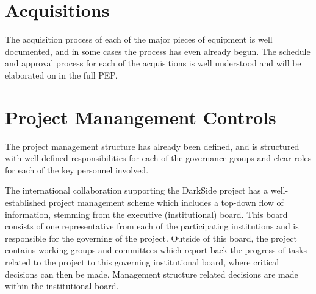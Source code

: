 


\section{Acquisitions}

The acquisition process of each of the major pieces of equipment is well documented, and in some cases the process has even already begun.  The schedule and approval process for each of the acquisitions is well understood and will be elaborated on in the full PEP.




\section{Project Manangement Controls}

The project management structure has already been defined, and is structured with well-defined responsibilities for each of the governance groups and clear roles for each of the key personnel involved.  

The international collaboration supporting the DarkSide project has a well-established project management scheme which includes a top-down flow of information, stemming from the executive (institutional) board.  This board consists of one representative from each of the participating institutions and is responsible for the governing of the project.  Outside of this board, the project contains working groups and committees which report back the progress of tasks related to the project to this governing institutional board, where critical decisions can then be made.  Management structure related decisions are made within the institutional board.  

